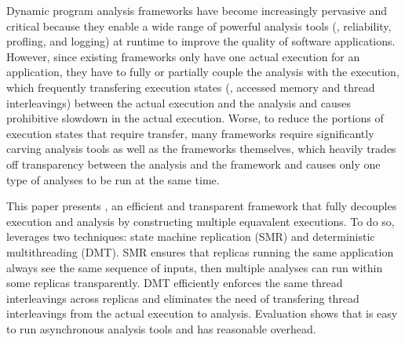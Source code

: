 
Dynamic program analysis frameworks have become increasingly pervasive and 
critical because they enable a wide range of powerful analysis tools (\eg, 
reliability, profling, and logging) at runtime to improve the quality of 
software applications. However, since existing frameworks only have one actual 
execution for an application, they have to fully or partially couple the 
analysis with the execution, which frequently transfering execution states 
(\eg, accessed memory and thread interleavings) between the actual execution 
and the analysis and causes prohibitive slowdown in the actual execution. 
Worse, to reduce the portions of execution states that require transfer, many 
frameworks require significantly carving analysis tools as well as the 
frameworks themselves, which heavily trades off transparency between the 
analysis and the framework and causes only one type of analyses to be run at 
the same time.


This paper presents \xxx, an efficient and transparent framework that fully 
decouples execution and analysis by constructing multiple equavalent 
executions. To do so, \xxx leverages two techniques: state machine replication 
(SMR) and deterministic multithreading (DMT). SMR ensures that replicas running 
the same application always see the same sequence of inputs, then multiple 
analyses can run within some replicas transparently. DMT efficiently enforces 
the same thread interleavings across replicas and eliminates the need of 
transfering thread interleavings from the actual execution to analysis. 
Evaluation shows that \xxx is easy to run asynchronous analysis tools and 
has reasonable overhead.
